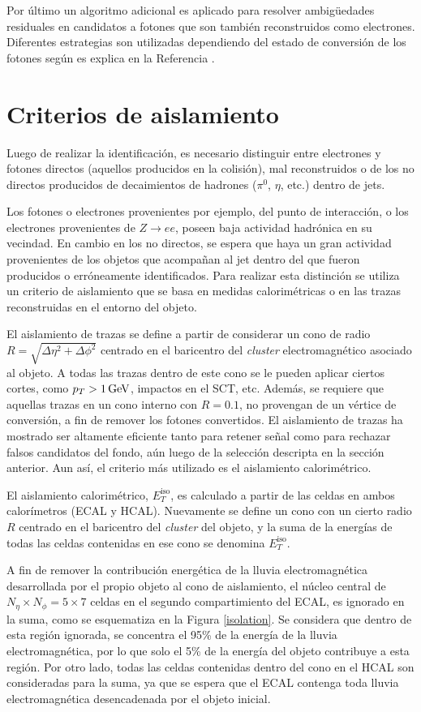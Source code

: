 Por último un algoritmo adicional es aplicado para resolver ambigüedades residuales en candidatos a fotones que son también reconstruidos como electrones. Diferentes estrategias son utilizadas dependiendo del estado de conversión de los fotones según es explica en la Referencia \cite{ambiguity}.


\section{Criterios de aislamiento}

Luego de realizar la identificación, es necesario distinguir entre electrones y fotones directos (aquellos producidos en la colisión), mal reconstruidos o de los no directos producidos de decaimientos de hadrones ($\pi^{0}$, $\eta$, etc.) dentro de jets.

Los fotones o electrones provenientes por ejemplo, del punto de interacción, o los electrones provenientes de $Z\rightarrow ee$, poseen baja actividad hadrónica en su vecindad. En cambio en los no directos, se espera que haya un gran actividad provenientes de los objetos que acompañan al jet dentro del que fueron producidos o erróneamente identificados. Para realizar esta distinción se utiliza un criterio de aislamiento que se basa en medidas calorimétricas o en las trazas reconstruidas en el entorno del objeto.

El aislamiento de trazas se define a partir de considerar un cono de radio $R=\sqrt{\Delta\eta^{2}+\Delta\phi^{2}}$ centrado en el baricentro del \textit{cluster} electromagnético asociado al objeto. A todas las trazas dentro de este cono se le pueden aplicar ciertos cortes, como $p_{T}>1 \, \mathrm{GeV}$, impactos en el SCT, etc. Además, se requiere que aquellas trazas en un cono interno con $R=0.1$, no provengan de un vértice de conversión, a fin de remover los fotones convertidos. El aislamiento de trazas ha mostrado ser altamente eficiente tanto para retener señal como para rechazar falsos candidatos del fondo, aún luego de la selección descripta en la sección anterior. Aun así, el criterio más utilizado es el aislamiento calorimétrico.

El aislamiento calorimétrico, $E_{T}^{\text{iso}}$, es calculado a partir de las celdas en ambos calorímetros (ECAL y HCAL). Nuevamente se define un cono con un cierto radio $R$ centrado en el baricentro del \textit{cluster} del objeto, y la suma de la energías de todas las celdas contenidas en ese cono se denomina $E_{T}^{\text{iso}}$. 

A fin de remover la contribución energética de la lluvia electromagnética desarrollada por el propio objeto al cono de aislamiento, el núcleo central de $N_{\eta}\times N_{\phi} = 5 \times 7$ celdas en el segundo compartimiento del ECAL, es ignorado en la suma, como se esquematiza en la Figura \ref{isolation}. Se considera que dentro de esta región ignorada, se concentra el 95\% de la energía de la lluvia electromagnética, por lo que solo el 5\% de la energía del objeto contribuye a esta región. Por otro lado, todas las celdas contenidas dentro del cono en el HCAL son consideradas para la suma, ya que se espera que el ECAL contenga toda lluvia electromagnética desencadenada por el objeto inicial. 

